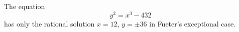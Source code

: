 \begin{proposition}\label{eq:072}
    The equation
\[
    y^2=x^3-432
\]
    has only the rational solution $x=12$, $y=\pm36$ in Fueter's exceptional case.
\end{proposition}
